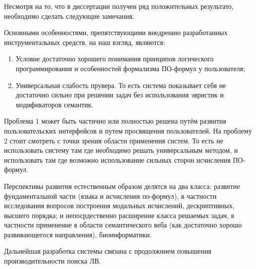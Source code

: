 Несмотря на то, что в диссертации получен ряд положительных результато, необходимо сделать следующие замечания.

Основными особенностями, препятствующими внедрению разработанных инструментальных средств, на наш взгляд, являются:

\begin{enumerate}
\item Условие достаточно хорошего понимания принципов логического программирования и особенностей формализма ПО-формул у пользователя;
\item Универсальная слабость прувера. То есть система показывает себя не достаточно сильно при решении задач без  использования эвристик и модификаторов семантик. 
\end{enumerate}

Проблема 1 может быть частично или полностью решена путём развития пользовательских интерфейсов и путем просвящения пользователей. На проблему 2 стоит смотреть с точки зрения области применения систем. То есть не использовать систему там где необходимо решать универсальным методом, и использовать там где возможно использование сильных сторон исчисления ПО-формул.


Перспективы развития естественным образом делятся на два класса: развитие фундаментальной части (языка и исчисления по-формул), в частности исследования вопросов построения модальных исчислений, дескриптивных, высшего порядка; и непосрдественно расширение класса решаемых задач, в частности применение в области семантического веба (как достаточно хорошо развивающегося направления), биоинформатики.

Дальнейшая разработка системы связана с продолжнием повышения производительности поиска ЛВ.


